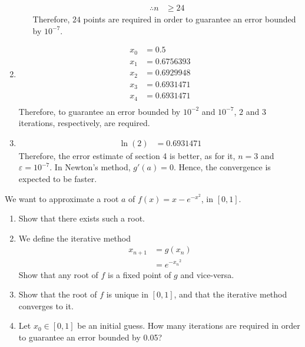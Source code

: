 \documentclass[fleqn, a4paper, 11pt, oneside]{amsart}
\theoremstyle{definition}
\theoremstyle{theorem}
\begin{document}
\begin{solution}
\begin{enumerate}[leftmargin=*]
\begin{enumerate}[leftmargin=*]
\begin{align*}
						\therefore n    & \ge 24
					\end{align*}
					Therefore, $24$ points are required in order to guarantee an error bounded by $10^{-7}$.
			\end{enumerate}
		\item
			\begin{align*}
				x_0 & = 0.5       \\
				x_1 & = 0.6756393 \\
				x_2 & = 0.6929948 \\
				x_3 & = 0.6931471 \\
				x_4 & = 0.6931471 \\
			\end{align*}
			Therefore, to guarantee an error bounded by $10^{-2}$ and $10^{-7}$, $2$ and $3$ iterations, respectively, are required.
		\item
			\begin{align*}
				\ln(2) & = 0.6931471
			\end{align*}
			Therefore, the error estimate of section 4 is better, as for it, $n = 3$ and $\varepsilon = 10^{-7}$.
			In Newton's method, $g'(a) = 0$.
			Hence, the convergence is expected to be faster.
	\end{enumerate}
\end{solution}

\begin{question}
	We want to approximate a root $a$ of $f(x) = x - e^{-x^2}$, in $[0,1]$.
	\begin{enumerate}
		\item
			Show that there exists such a root.
		\item
			We define the iterative method
			\begin{align*}
				x_{n + 1} & = g(x_n) \\
                                          & = e^{-{x_n}^2}
			\end{align*}
			Show that any root of $f$ is a fixed point of $g$ and vice-versa.
		\item
			Show that the root of $f$ is unique in $[0,1]$, and that the iterative method converges to it.
		\item
			Let $x_0 \in [0,1]$ be an initial guess.
			How many iterations are required in order to guarantee an error bounded by 0.05?
	\end{enumerate}
\end{question}
\end{document}
